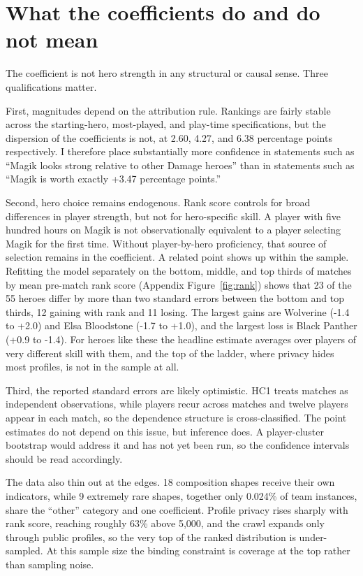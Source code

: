 \documentclass[11pt]{article}
\begin{document}
\FloatBarrier
\section*{What the coefficients do and do not mean}

The coefficient is not hero strength in any structural or causal sense. Three qualifications
matter.

First, magnitudes depend on the attribution rule. Rankings are fairly stable across the
starting-hero, most-played, and play-time specifications, but the dispersion of the coefficients
is not, at 2.60, 4.27, and 6.38 percentage points respectively. I therefore place
substantially more confidence in statements such as ``Magik looks strong relative to other
Damage heroes'' than in statements such as ``Magik is worth exactly +3.47
percentage points.''

Second, hero choice remains endogenous. Rank score controls for broad differences in player
strength, but not for hero-specific skill. A player with five hundred hours on Magik is not
observationally equivalent to a player selecting Magik for the first time. Without
player-by-hero proficiency, that source of selection remains in the coefficient. A related point
shows up within the sample. Refitting the model separately on the bottom, middle, and top thirds
of matches by mean pre-match rank score (Appendix Figure~\ref{fig:rank}) shows that
23 of the 55 heroes differ by more than two standard errors between the bottom and
top thirds, 12 gaining with rank and 11 losing. The largest
gains are Wolverine (-1.4 to +2.0) and Elsa Bloodstone (-1.7 to +1.0), and the largest loss is Black Panther (+0.9 to -1.4). For heroes like
these the headline estimate averages over players of very different skill with them, and the top
of the ladder, where privacy hides most profiles, is not in the sample at all.

Third, the reported standard errors are likely optimistic. HC1 treats matches as independent
observations, while players recur across matches and twelve players appear in each match, so the
dependence structure is cross-classified. The point estimates do not depend on this issue, but
inference does. A player-cluster bootstrap would address it and has not yet been run, so the
confidence intervals should be read accordingly.

The data also thin out at the edges. 18 composition shapes receive their own indicators, while 9 extremely rare shapes, together only 0.024\% of team instances, share the ``other'' category and one coefficient. Profile privacy rises sharply with rank
score, reaching roughly 63\% above 5{,}000, and the crawl expands only through public
profiles, so the very top of the ranked distribution is under-sampled. At this sample size the
binding constraint is coverage at the top rather than sampling noise.
\end{document}
